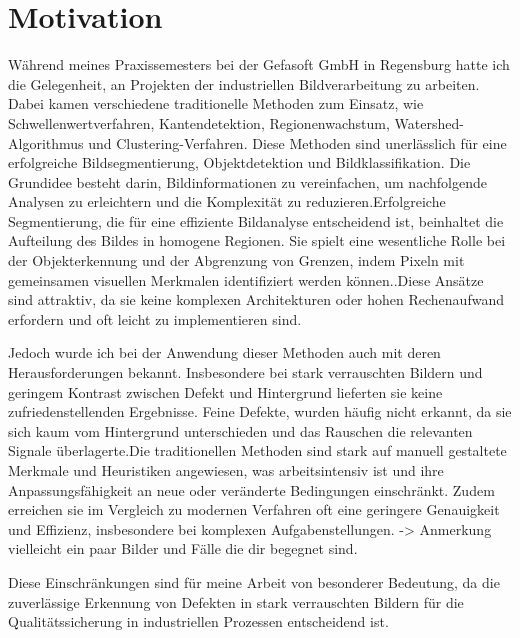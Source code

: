 \section{Motivation}
Während meines Praxissemesters bei der Gefasoft GmbH in Regensburg hatte ich die Gelegenheit, an Projekten der industriellen Bildverarbeitung zu arbeiten. Dabei kamen verschiedene traditionelle Methoden zum Einsatz, wie Schwellenwertverfahren, Kantendetektion, Regionenwachstum, Watershed-Algorithmus und Clustering-Verfahren. Diese Methoden sind unerlässlich für eine erfolgreiche Bildsegmentierung, Objektdetektion und Bildklassifikation. \cite{suse_bildverarbeitung_2014,szeliski_computer_2022}Die Grundidee besteht darin, Bildinformationen zu vereinfachen, um nachfolgende Analysen zu erleichtern und die Komplexität zu reduzieren.Erfolgreiche Segmentierung, die für eine effiziente Bildanalyse entscheidend ist, beinhaltet die Aufteilung des Bildes in homogene Regionen. Sie spielt eine wesentliche Rolle bei der Objekterkennung und der Abgrenzung von Grenzen, indem Pixeln mit gemeinsamen visuellen Merkmalen identifiziert werden können.\cite{jahne_digitale_2024}.Diese Ansätze sind attraktiv, da sie keine komplexen Architekturen oder hohen Rechenaufwand erfordern und oft leicht zu implementieren sind. 

Jedoch wurde ich bei der Anwendung dieser Methoden auch mit deren Herausforderungen bekannt. Insbesondere bei stark verrauschten Bildern und geringem Kontrast zwischen Defekt und Hintergrund lieferten sie keine zufriedenstellenden Ergebnisse. Feine Defekte, wurden häufig nicht erkannt, da sie sich kaum vom Hintergrund unterschieden und das Rauschen die relevanten Signale überlagerte.Die traditionellen Methoden sind stark auf manuell gestaltete Merkmale und Heuristiken angewiesen, was arbeitsintensiv ist und ihre Anpassungsfähigkeit an neue oder veränderte Bedingungen einschränkt. Zudem erreichen sie im Vergleich zu modernen Verfahren oft eine geringere Genauigkeit und Effizienz, insbesondere bei komplexen Aufgabenstellungen. \cite{zhao_object_2019} -> Anmerkung vielleicht ein paar Bilder und Fälle die dir begegnet sind.

Diese Einschränkungen sind für meine Arbeit von besonderer Bedeutung, da die zuverlässige Erkennung von Defekten in stark verrauschten Bildern für die Qualitätssicherung in industriellen Prozessen entscheidend ist.

